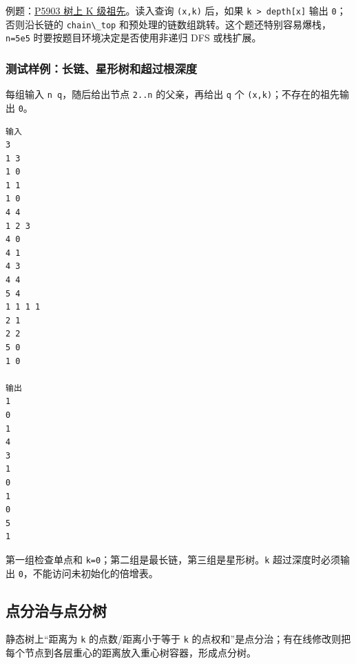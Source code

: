 例题：\href{https://www.luogu.com.cn/problem/P5903}{P5903 树上 K 级祖先}。读入查询 \passthrough{\lstinline!(x,k)!} 后，如果 \passthrough{\lstinline!k > depth[x]!} 输出 \passthrough{\lstinline!0!}；否则沿长链的 \passthrough{\lstinline!chain\_top!} 和预处理的链数组跳转。这个题还特别容易爆栈，\passthrough{\lstinline!n=5e5!} 时要按题目环境决定是否使用非递归 DFS 或栈扩展。

\subsubsection{测试样例：长链、星形树和超过根深度}

每组输入 \passthrough{\lstinline!n q!}，随后给出节点 \passthrough{\lstinline!2..n!} 的父亲，再给出 \passthrough{\lstinline!q!} 个 \passthrough{\lstinline!(x,k)!}；不存在的祖先输出 \passthrough{\lstinline!0!}。

\begin{lstlisting}
输入
3
1 3
1 0
1 1
1 0
4 4
1 2 3
4 0
4 1
4 3
4 4
5 4
1 1 1 1
2 1
2 2
5 0
1 0

输出
1
0
1
4
3
1
0
1
0
5
1
\end{lstlisting}

第一组检查单点和 \passthrough{\lstinline!k=0!}；第二组是最长链，第三组是星形树。\passthrough{\lstinline!k!} 超过深度时必须输出 \passthrough{\lstinline!0!}，不能访问未初始化的倍增表。


\subsection{点分治与点分树}

静态树上``距离为 \passthrough{\lstinline!k!} 的点数/距离小于等于 \passthrough{\lstinline!k!} 的点权和''是点分治；有在线修改则把每个节点到各层重心的距离放入重心树容器，形成点分树。


